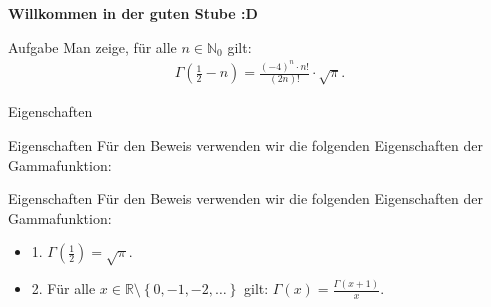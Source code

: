 \documentclass[10pt]{beamer}
\title{}
\author{Artur's \( \oint \) Mathematikstübchen}
\date{}
\def\bN{\mathbb{N}}
\def\bR{\mathbb{R}}
\begin{document}

\begin{frame}
    \begin{center}
        \textbf{\huge Willkommen in der guten Stube \newline \newline :D}
    \end{center}
\end{frame}




\begin{frame}
    \begin{alertblock}{Aufgabe}
        Man zeige, für alle \( n \in \bN_{0} \) gilt:
        \begin{align*}
            \Gamma\left( \frac{1}{2} - n \right)
            = \frac{\left( - 4 \right)^{n} \cdot n!}{\left( 2n \right)!} \cdot \sqrt{\pi}.
        \end{align*}
    \end{alertblock}
\end{frame}



\begin{frame}{Eigenschaften}
    
\end{frame}



\begin{frame}{Eigenschaften}
    Für den Beweis verwenden wir die folgenden Eigenschaften der Gammafunktion:
\end{frame}



\begin{frame}{Eigenschaften}
    Für den Beweis verwenden wir die folgenden Eigenschaften der Gammafunktion:
    \begin{itemize}
        \item<1-> 1. \( \Gamma\left( \frac{1}{2} \right) = \sqrt{\pi} \).
        \item<2->  2. Für alle \( x \in \bR \setminus \left\{ 0, -1, -2, \ldots \right\} \) gilt: \( \Gamma\left( x \right) = \frac{\Gamma\left( x + 1 \right)}{x} \).
    \end{itemize}
\end{frame}
\end{document}
